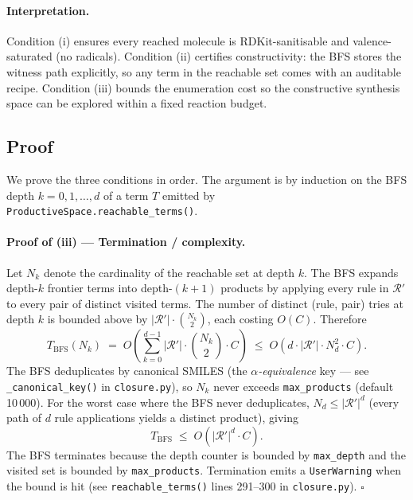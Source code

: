 \paragraph{Interpretation.}
Condition (i) ensures every reached molecule is RDKit-sanitisable
and valence-saturated (no radicals).  Condition (ii) certifies
constructivity: the BFS stores the witness path explicitly, so any
term in the reachable set comes with an auditable recipe.
Condition (iii) bounds the enumeration cost so the constructive
synthesis space can be explored within a fixed reaction budget.

\subsection{Proof}
\label{sec:closure-proof}

We prove the three conditions in order.  The argument is by
induction on the BFS depth $k = 0, 1, \dots, d$ of a term $T$
emitted by \texttt{ProductiveSpace.reachable\_terms()}.

\paragraph{Proof of (iii) — Termination / complexity.}

Let $N_k$ denote the cardinality of the reachable set at depth $k$.
The BFS expands depth-$k$ frontier terms into depth-$(k{+}1)$
products by applying every rule in $\mathcal{R}'$ to every pair of
distinct visited terms.  The number of distinct (rule, pair) tries at
depth $k$ is bounded above by $|\mathcal{R}'| \cdot \binom{N_k}{2}$,
each costing $O(C)$.  Therefore
\begin{equation}
  T_{\mathrm{BFS}}(N_k)
  \;=\; O\!\left( \sum_{k=0}^{d-1} |\mathcal{R}'| \cdot
                 \binom{N_k}{2} \cdot C \right)
  \;\le\; O\!\left( d \cdot |\mathcal{R}'| \cdot N_d^2 \cdot C \right).
  \label{eq:complexity-bfs}
\end{equation}
The BFS deduplicates by canonical SMILES (the
\emph{$\alpha$-equivalence} key — see
\texttt{\_canonical\_key()} in \texttt{closure.py}), so $N_k$ never
exceeds \texttt{max\_products} (default 10\,000).  For the worst
case where the BFS never deduplicates, $N_d \le |\mathcal{R}'|^d$
(every path of $d$ rule applications yields a distinct product),
giving
\begin{equation}
  T_{\mathrm{BFS}} \;\le\; O\!\left( |\mathcal{R}'|^d \cdot C \right).
  \label{eq:complexity-theorem}
\end{equation}
The BFS terminates because the depth counter is bounded by
\texttt{max\_depth} and the visited set is bounded by
\texttt{max\_products}.  Termination emits a
\texttt{UserWarning} when the bound is hit (see
\texttt{reachable\_terms()} lines 291--300 in
\texttt{closure.py}).  $\square$


